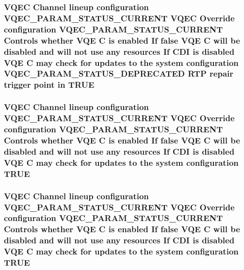 \subsubsection{\setlength{\rightskip}{0pt plus 5cm}VQEC Channel lineup configuration VQEC\_\-PARAM\_\-STATUS\_\-CURRENT VQEC Override configuration VQEC\_\-PARAM\_\-STATUS\_\-CURRENT Controls whether VQE \bf{C} is enabled If false VQE \bf{C} will be disabled and will not use any resources If CDI is disabled VQE \bf{C} may check for updates \bf{to} the system configuration VQEC\_\-PARAM\_\-STATUS\_\-DEPRECATED RTP repair trigger point in \bf{TRUE}}\label{vqec__cfg__settings_8h_d8b5de84915eb9652bf81be52f47aa9a}


\subsubsection{\setlength{\rightskip}{0pt plus 5cm}VQEC Channel lineup configuration VQEC\_\-PARAM\_\-STATUS\_\-CURRENT VQEC Override configuration VQEC\_\-PARAM\_\-STATUS\_\-CURRENT Controls whether VQE \bf{C} is enabled If false VQE \bf{C} will be disabled and will not use any resources If CDI is disabled VQE \bf{C} may check for updates \bf{to} the system configuration \bf{TRUE}}\label{vqec__cfg__settings_8h_ec8519b59092e4f991d4a4ab0df44712}


\subsubsection{\setlength{\rightskip}{0pt plus 5cm}VQEC Channel lineup configuration VQEC\_\-PARAM\_\-STATUS\_\-CURRENT VQEC Override configuration VQEC\_\-PARAM\_\-STATUS\_\-CURRENT Controls whether VQE \bf{C} is enabled If false VQE \bf{C} will be disabled and will not use any resources If CDI is disabled VQE \bf{C} may check for updates \bf{to} the system configuration \bf{TRUE}}\label{vqec__cfg__settings_8h_ec8519b59092e4f991d4a4ab0df44712}



